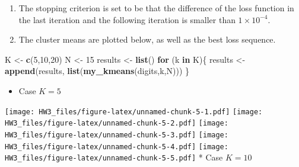 \documentclass[]{article}
\newenvironment{Shaded}{\begin{snugshade}}{\end{snugshade}}
\newcommand{\KeywordTok}[1]{\textcolor[rgb]{0.13,0.29,0.53}{\textbf{#1}}}
\newcommand{\DecValTok}[1]{\textcolor[rgb]{0.00,0.00,0.81}{#1}}
\newcommand{\StringTok}[1]{\textcolor[rgb]{0.31,0.60,0.02}{#1}}
\newcommand{\ControlFlowTok}[1]{\textcolor[rgb]{0.13,0.29,0.53}{\textbf{#1}}}
\newcommand{\OperatorTok}[1]{\textcolor[rgb]{0.81,0.36,0.00}{\textbf{#1}}}
\newcommand{\NormalTok}[1]{#1}
\providecommand{\tightlist}{%
  \setlength{\itemsep}{0pt}\setlength{\parskip}{0pt}}
\begin{document}
\begin{enumerate}
\def\labelenumi{\arabic{enumi}.}
\setcounter{enumi}{2}
\tightlist
\item
  The stopping criterion is set to be that the difference of the loss
  function in the last iteration and the following iteration is smaller
  than \(1\times 10^{-4}\).
\item
  The cluster means are plotted below, as well as the best loss
  sequence.
\end{enumerate}

\begin{Shaded}
\begin{Highlighting}[]
\NormalTok{K <-}\StringTok{ }\KeywordTok{c}\NormalTok{(}\DecValTok{5}\NormalTok{,}\DecValTok{10}\NormalTok{,}\DecValTok{20}\NormalTok{)}
\NormalTok{N <-}\StringTok{ }\DecValTok{15}
\NormalTok{results <-}\StringTok{ }\KeywordTok{list}\NormalTok{()}
\ControlFlowTok{for}\NormalTok{ (k }\ControlFlowTok{in}\NormalTok{ K)\{}
\NormalTok{  results <-}\StringTok{ }\KeywordTok{append}\NormalTok{(results, }\KeywordTok{list}\NormalTok{(}\KeywordTok{my_kmeans}\NormalTok{(digits,k,N)))}
\NormalTok{\}}
\end{Highlighting}
\end{Shaded}

\begin{itemize}
\tightlist
\item
  Case \(K = 5\)
\end{itemize}

\begin{Shaded}
\end{Shaded}

\texttt{[image: HW3\_files/figure-latex/unnamed-chunk-5-1.pdf]}
\texttt{[image: HW3\_files/figure-latex/unnamed-chunk-5-2.pdf]}
\texttt{[image: HW3\_files/figure-latex/unnamed-chunk-5-3.pdf]}
\texttt{[image: HW3\_files/figure-latex/unnamed-chunk-5-4.pdf]}
\texttt{[image: HW3\_files/figure-latex/unnamed-chunk-5-5.pdf]} * Case
\(K = 10\)

\begin{Shaded}
\end{Shaded}
\end{document}
